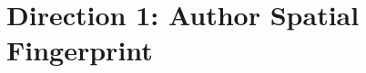 \documentclass[logo,msc]{infthesis}
\begin{document}
\section{Direction 1: Author Spatial Fingerprint}
%
%
%
%
%
\end{document}

